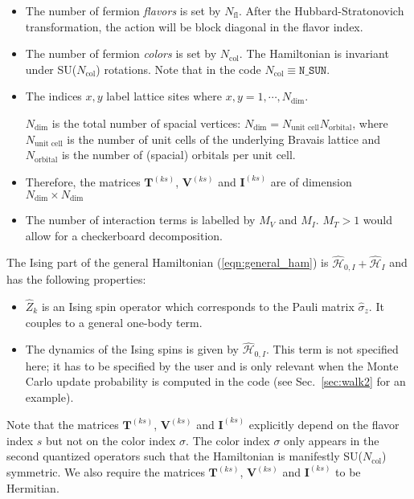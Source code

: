 \begin{itemize}
\item The number of fermion \textit{flavors} is set by $N_{\mathrm{fl}}$.  After the Hubbard-Stratonovich transformation, the action will be block diagonal in the flavor index. 
\item The number of fermion \textit{colors} is set by $N_{\mathrm{col}}$.    The Hamiltonian is invariant under  SU($N_{\mathrm{col}}$)  rotations. Note that  in the code $ N_{\mathrm{col}} \equiv \texttt{N\_{SUN}} $. 
\item The indices $x,y$ label lattice sites where $x,y=1,\cdots, N_{\mathrm{dim}}$. 

$N_{\mathrm{dim}}$ is the total number of spacial vertices: $N_{\mathrm{dim}}=N_{\text{unit cell}} N_{\mathrm{orbital}}$, 
where $N_{\text{unit cell}}$ is the number of unit cells of the underlying Bravais lattice and $N_{\mathrm{orbital}}$ is the number of (spacial) orbitals per unit cell.
\item Therefore, the  matrices $\bm{T}^{(k s)}$, $\bm{V}^{(ks)}$  and $\bm{I}^{(ks)}$ are  of dimension $N_{\mathrm{dim}}\times N_{\mathrm{dim}}$
\item The number of interaction terms  is labelled by $M_V$   and $M_I$.   $M_T> 1 $ would allow for a checkerboard decomposition.
\end{itemize}
The Ising part of the general Hamiltonian (\ref{eqn:general_ham}) is $\hat{\mathcal{H}}_{0,I}+ \hat{\mathcal{H}}_{I}$ and  has the following properties:
\begin{itemize}
\item $\hat{Z}_k$ is an Ising spin operator which corresponds to the Pauli matrix $\hat{\sigma}_{z}$. It couples to a general one-body term. 
\item  The dynamics of the Ising spins is given by $\hat{\mathcal{H}}_{0,I}$. This term is not specified here; 
it has to be specified by the user and is only relevant when the Monte Carlo update probability is computed in the code (see Sec.~\ref{sec:walk2} for an example).
\end{itemize}
Note that the matrices  $\bm{T}^{(ks)}$,  $\bm{V}^{(ks)}$ and  $\bm{I}^{(ks)}$ explicitly depend on the flavor index $s$ but not on the color index $\sigma$. 
The color index $\sigma$ only appears in  the  second quantized operators such that the Hamiltonian is manifestly SU($N_{\mathrm{col}}$)    symmetric.  We also require
the matrices $\bm{T}^{(ks)}$,  $\bm{V}^{(ks)}$ and  $\bm{I}^{(ks)}$  to be  Hermitian.


